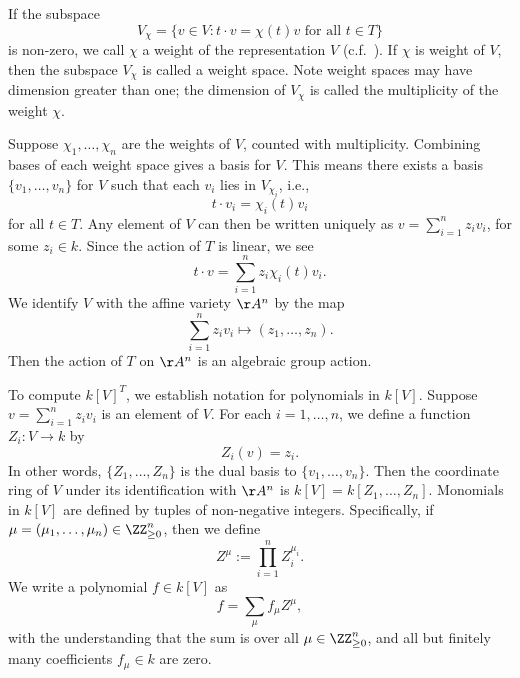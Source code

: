 \documentclass[12pt]{amsart}
\theoremstyle{plain}
\begin{document}
If the subspace
$$V_\chi = \{v \in V : t \cdot v = \chi(t) v \text{ for all } t \in T\}$$
is non-zero, we call $\chi$ a weight of the representation $V$ (c.f.\ \cite[7.1.1]{Springer98}).
If $\chi$ is weight of $V$, then the subspace $V_\chi$ is called a weight space.
Note weight spaces may have dimension greater than one; the dimension of $V_\chi$ is called the multiplicity of the weight $\chi$.

Suppose $\chi_1, \ldots, \chi_n$ are the weights of $V$, counted with multiplicity.
Combining bases of each weight space gives a basis for $V$.
This means there exists a basis $\{v_1, \ldots, v_n\}$ for $V$ such that each $v_i$ lies in $V_{\chi_i}$, i.e.,
$$t \cdot v_i = \chi_i(t) v_i$$
for all $t \in T$.
Any element of $V$ can then be written uniquely as $v = \sum_{i=1}^n z_i v_i$, for some $z_i \in k$.
Since the action of $T$ is linear, we see
$$t \cdot v = \sum_{i=1}^n  z_i \chi_i(t) v_i.$$
We identify $V$ with the affine variety $\AA^n$ by the map 
$$\sum_{i=1}^n z_i v_i \mapsto (z_1, \ldots, z_n).$$
Then the action of $T$ on $\AA^n$ is an algebraic group action.

To compute $k[V]^T$, we establish notation for polynomials in $k[V]$.
Suppose $v = \sum_{i=1}^n z_i v_i$ is an element of $V$.
For each $i=1, \ldots, n$, we define a function $Z_i : V \to k$ by
$$Z_i(v) = z_i.$$
In other words, $\{Z_1, \ldots, Z_n\}$ is the dual basis to $\{v_1, \ldots, v_n\}$.
Then the coordinate ring of $V$ under its identification with $\AA^n$ is $k[V] = k[Z_1, \ldots, Z_n]$.
Monomials in $k[V]$ are defined by tuples of non-negative integers.
Specifically, if $\mu = (\mu_1, \ldots, \mu_n) \in \ZZ_{\ge 0}^n$, then we define
$$Z^\mu := \prod_{i=1}^n Z_i^{\mu_i}.$$
We write a polynomial $f \in k[V]$ as
$$f = \sum_\mu f_\mu Z^\mu,$$
with the understanding that the sum is over all $\mu \in \ZZ_{\ge 0}^n$, and all but finitely many coefficients $f_\mu \in k$ are zero.
\end{document}
